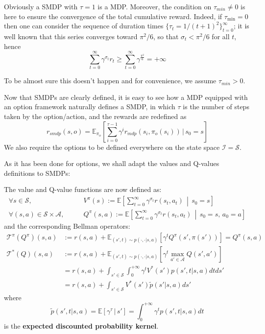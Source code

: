 Obviously a SMDP with $\tau=1$ is a MDP. Moreover, the condition on $\tau_{min} \neq 0$ is here to ensure the convergence of the total cumulative reward. Indeed, if $\tau_{\min} = 0$ then one can consider the sequence of duration times $\{\tau_t = 1/(t + 1)^2\}_{t=0}^{\infty}$; it is well known that this series converges toward $\pi^2/6$, so that $\sigma_t < \pi^2/6$ for all $t$, hence $$\sum_{t = 0}^{\infty} \gamma^{\sigma_t} r_t \geq \sum_{t=0}^{\infty} \gamma^{\frac{\pi^2}{6}} = + \infty$$

To be almost sure this doesn't happen and for convenience, we assume $\tau_{min} > 0$.

Now that SMDPs are clearly defined, it is easy to see how a MDP equipped with an option framework naturally defines a SMDP, in which $\tau$ is the number of steps taken by the option/action, and the rewards are redefined as $$r_{smdp}(s, o) = \mathbb{E}_{\pi_o} \left[ \sum_{i=0}^{\tau-1}\gamma^i r_{mdp}(s_i, \pi_o(s_i)) \,|\, s_0=s\right]$$ We also require the options to be defined everywhere on the state space $\mathcal{I} = \mathcal{S}$.

As it has been done for options, we shall adapt the values and Q-values definitions to SMDPs:

\begin{thm}\label{thm:values-SMDP}
  The value and Q-value functions are now defined as:
  \begin{align*}
    \forall s \in \mathcal{S}, \qquad &V^{\pi}(s) := \mathbb{E} \left[\sum_{t = 0}^{\infty} \gamma^{\sigma_{t}} r(s_t, a_t) \, \middle| \,  s_0 = s \right]\\
    \forall (s, a) \in \mathcal{S} \times \mathcal{A}, \qquad &Q^{\pi}(s,a) := \mathbb{E} \left[\sum_{t = 0}^{\infty} \gamma^{\sigma_{t}} r(s_t, a_t) \, \middle| \,  s_0 = s,\, a_0 = a \right]
  \end{align*}
  and the corresponding Bellman operators:
  \begin{align*}
    \mathcal{T}^\pi(Q^{\pi})(s, a) &:= r(s, a) + \mathbb{E}_{(s', t) \sim p(\cdot, \cdot | s, a)} \left[ \gamma^t Q^{\pi}(s', \pi(s')) \right] = Q^{\pi}(s, a)\\
    \mathcal{T^*}(Q)(s, a) &:= r(s, a) + \mathbb{E}_{(s', t) \sim p(\cdot, \cdot | s, a)} \left[ \gamma^t \max_{a' \in \mathcal{A}} Q(s', a') \right]\\
    &= r(s, a) + \int_{s' \in \mathcal{S}} \int_0^{+ \infty} \gamma^t V^*(s') p(s', t | s, a) dt ds' \\
    &= r(s, a) + \int_{s' \in \mathcal{S}} V^*(s') \tilde p(s' | s, a) ds'
  \end{align*}
  where $$\tilde p(s', t | s, a) = \mathbb{E}\left[ \gamma^\tau \,|\, s'\right] = \int_0^{+\infty} \gamma^t p(s', t | s, a) dt$$ is the \textbf{expected discounted probability kernel}.
\end{thm}

